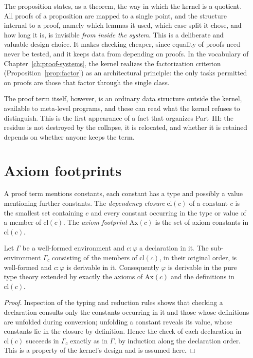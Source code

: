 The proposition states, as a theorem, the way in which the kernel is a quotient. All proofs of a proposition are mapped to a single point, and the structure internal to a proof, namely which lemmas it used, which case split it chose, and how long it is, is invisible \emph{from inside the system}. This is a deliberate and valuable design choice. It makes checking cheaper, since equality of proofs need never be tested, and it keeps data from depending on proofs. In the vocabulary of Chapter~\ref{ch:proof-systems}, the kernel realizes the factorization criterion (Proposition~\ref{prop:factor}) as an architectural principle: the only tasks permitted on proofs are those that factor through the single class.

The proof term itself, however, is an ordinary data structure outside the kernel, available to meta-level programs, and these can read what the kernel refuses to distinguish. This is the first appearance of a fact that organizes Part~III: the residue is not destroyed by the collapse, it is relocated, and whether it is retained depends on whether anyone keeps the term.

\section{Axiom footprints}
\label{sec:footprint}

A proof term mentions constants, each constant has a type and possibly a value mentioning further constants. The \emph{dependency closure} $\mathrm{cl}(c)$ of a constant $c$ is the smallest set containing $c$ and every constant occurring in the type or value of a member of $\mathrm{cl}(c)$. The \emph{axiom footprint} $\mathrm{Ax}(c)$ is the set of axiom constants in $\mathrm{cl}(c)$.

\begin{proposition}
\label{prop:locality}
Let $\Gamma$ be a well-formed environment and $c:\varphi$ a declaration in it. The sub-environment $\Gamma_c$ consisting of the members of $\mathrm{cl}(c)$, in their original order, is well-formed and $c:\varphi$ is derivable in it. Consequently $\varphi$ is derivable in the pure type theory extended by exactly the axioms of $\mathrm{Ax}(c)$ and the definitions in $\mathrm{cl}(c)$.
\end{proposition}

\begin{proof}
Inspection of the typing and reduction rules shows that checking a declaration consults only the constants occurring in it and those whose definitions are unfolded during conversion; unfolding a constant reveals its value, whose constants lie in the closure by definition. Hence the check of each declaration in $\mathrm{cl}(c)$ succeeds in $\Gamma_c$ exactly as in $\Gamma$, by induction along the declaration order. This is a property of the kernel's design and is assumed here.
\end{proof}

